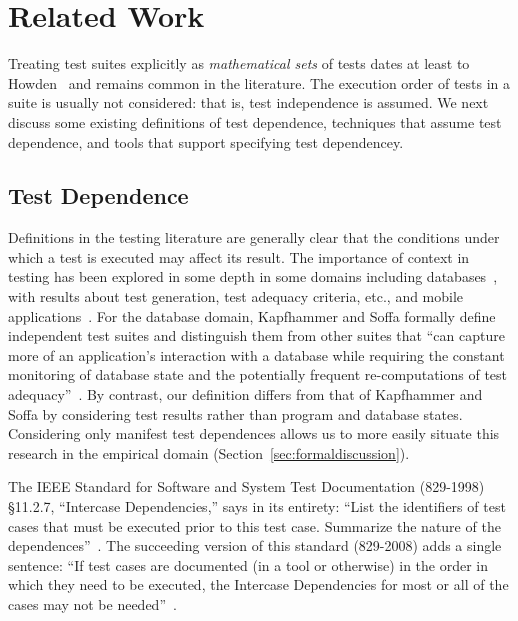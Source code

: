 \section{Related Work}
\label{sec:related}


Treating test suites explicitly as \emph{mathematical sets} of tests dates at least
to Howden~\cite[p.~554]{howden:ToC:1975} and remains common in the literature.
The execution order of tests in a suite is usually not considered:
that is, test independence is assumed. We next discuss some
existing definitions of test dependence, techniques that
assume test dependence, and tools that support specifying
test dependencey.


\subsection{Test Dependence}

Definitions in the testing literature are generally clear that the
conditions under which a test is executed may affect its result. 
The
importance of context in testing has been explored in some depth in
some domains including databases~\cite{Gray:1994:QGB:191843.191886,Chays:2000:FTD:347324.348954,
kapfhammeretal:FSE:2003}, with results about test
generation, test adequacy criteria, etc., and mobile
applications~\cite{Wang:2007:AGC}.
For the database domain, Kapfhammer and Soffa formally
define independent test suites and distinguish them from
other suites that ``can capture more of an application's
interaction with a database while requiring the constant monitoring of
database state and the potentially frequent re-computations of test
adequacy''~\cite[p.~101]{kapfhammeretal:FSE:2003}.
By contrast, our definition differs from that of Kapfhammer
and Soffa by considering
test results rather than program and database states.
Considering only manifest test dependences allows
us to more easily situate this research in the empirical domain (Section~\ref{sec:formaldiscussion}).

The IEEE Standard for Software and System Test
Documentation (829-1998) \S 11.2.7, ``Intercase
Dependencies,'' says in its entirety: ``List the identifiers of
test cases that must be executed prior to this test
case. Summarize
the nature of the dependences''~\cite{IEEE:829-1998}.  The succeeding version of this
standard (829-2008) adds a single sentence: ``If
test cases are documented (in a tool or otherwise) in the order in
which they need to be executed, the Intercase Dependencies for most or
all of the cases may not be needed''~\cite{IEEE:829-2008}.


